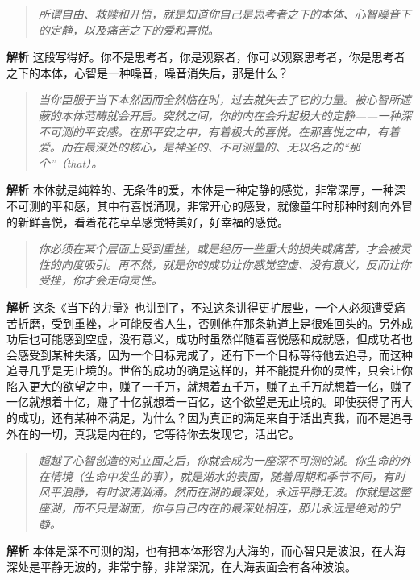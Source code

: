 \begin{quote}\it
    所谓自由、救赎和开悟，就是知道你自己是思考者之下的本体、心智噪音下的定静，以及痛苦之下的爱和喜悦。
\end{quote}

\textbf{解析} 这段写得好。你不是思考者，你是观察者，你可以观察思考者，你是思考者之下的本体，心智是一种噪音，噪音消失后，那是什么？

\begin{quote}\it
    当你臣服于当下本然因而全然临在时，过去就失去了它的力量。被心智所遮蔽的本体范畴就会开启。突然之间，你的内在会升起极大的定静——一种深不可测的平安感。在那平安之中，有着极大的喜悦。在那喜悦之中，有着爱。而在最深处的核心，是神圣的、不可测量的、无以名之的“那个”（that）。
\end{quote}

\textbf{解析} 本体就是纯粹的、无条件的爱，本体是一种定静的感觉，非常深厚，一种深不可测的平和感，其中有喜悦涌现，非常开心的感受，就像童年时那种时刻向外冒的新鲜喜悦，看着花花草草感觉特美好，好幸福的感觉。

\begin{quote}\it
    你必须在某个层面上受到重挫，或是经历一些重大的损失或痛苦，才会被灵性的向度吸引。再不然，就是你的成功让你感觉空虚、没有意义，反而让你受挫，你才会走向灵性。
\end{quote}

\textbf{解析} 这条《当下的力量》也讲到了，不过这条讲得更扩展些，一个人必须遭受痛苦折磨，受到重挫，才可能反省人生，否则他在那条轨道上是很难回头的。另外成功后也可能感到空虚，没有意义，成功时虽然伴随着喜悦感和成就感，但成功者也会感受到某种失落，因为一个目标完成了，还有下一个目标等待他去追寻，而这种追寻几乎是无止境的。世俗的成功的确是这样的，并不能提升你的灵性，只会让你陷入更大的欲望之中，赚了一千万，就想着五千万，赚了五千万就想着一亿，赚了一亿就想着十亿，赚了十亿就想着一百亿，这个欲望是无止境的。即使获得了再大的成功，还有某种不满足，为什么？因为真正的满足来自于活出真我，而不是追寻外在的一切，真我是内在的，它等待你去发现它，活出它。

\begin{quote}\it
    超越了心智创造的对立面之后，你就会成为一座深不可测的湖。你生命的外在情境（生命中发生的事），就是湖水的表面，随着周期和季节不同，有时风平浪静，有时波涛汹涌。然而在湖的最深处，永远平静无波。你就是这整座湖，而不只是湖面，你与自己内在的最深处相连，那儿永远是绝对的宁静。
\end{quote}

\textbf{解析} 本体是深不可测的湖，也有把本体形容为大海的，而心智只是波浪，在大海深处是平静无波的，非常宁静，非常深沉，在大海表面会有各种波浪。

